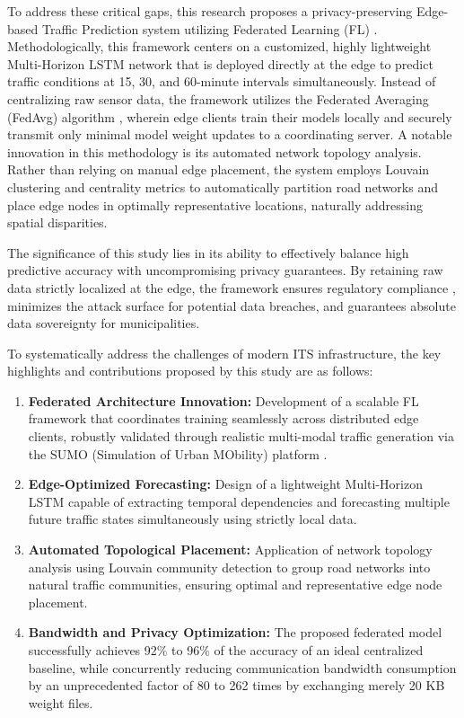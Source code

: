 \documentclass[pdflatex,sn-mathphys-num]{sn-jnl}
\theoremstyle{thmstyleone}
\theoremstyle{thmstyletwo}
\theoremstyle{thmstylethree}
\begin{document}
To address these critical gaps, this research proposes a privacy-preserving Edge-based Traffic Prediction system utilizing Federated Learning (FL) \cite{mcmahan2017fedavg}. Methodologically, this framework centers on a customized, highly lightweight Multi-Horizon LSTM network \cite{hochreiter1997lstm} that is deployed directly at the edge to predict traffic conditions at 15, 30, and 60-minute intervals simultaneously. Instead of centralizing raw sensor data, the framework utilizes the Federated Averaging (FedAvg) algorithm \cite{mcmahan2017fedavg}, wherein edge clients train their models locally and securely transmit only minimal model weight updates to a coordinating server. A notable innovation in this methodology is its automated network topology analysis. Rather than relying on manual edge placement, the system employs Louvain clustering \cite{blondel2008louvain} and centrality metrics to automatically partition road networks and place edge nodes in optimally representative locations, naturally addressing spatial disparities.

The significance of this study lies in its ability to effectively balance high predictive accuracy with uncompromising privacy guarantees. By retaining raw data strictly localized at the edge, the framework ensures regulatory compliance \cite{gdpr2016}, minimizes the attack surface for potential data breaches, and guarantees absolute data sovereignty for municipalities.

To systematically address the challenges of modern ITS infrastructure, the key highlights and contributions proposed by this study are as follows:

\begin{enumerate}
    \item \textbf{Federated Architecture Innovation:} Development of a scalable FL framework \cite{mcmahan2017fedavg,tariq2024trustworthy} that coordinates training seamlessly across distributed edge clients, robustly validated through realistic multi-modal traffic generation via the SUMO (Simulation of Urban MObility) platform \cite{lopez2018sumo}.
    \item \textbf{Edge-Optimized Forecasting:} Design of a lightweight Multi-Horizon LSTM \cite{hochreiter1997lstm} capable of extracting temporal dependencies and forecasting multiple future traffic states simultaneously using strictly local data.
    \item \textbf{Automated Topological Placement:} Application of network topology analysis using Louvain community detection \cite{blondel2008louvain} to group road networks into natural traffic communities, ensuring optimal and representative edge node placement.
    \item \textbf{Bandwidth and Privacy Optimization:} The proposed federated model successfully achieves 92\% to 96\% of the accuracy of an ideal centralized baseline, while concurrently reducing communication bandwidth consumption by an unprecedented factor of 80 to 262 times by exchanging merely 20 KB weight files.
\end{enumerate}
\end{document}

